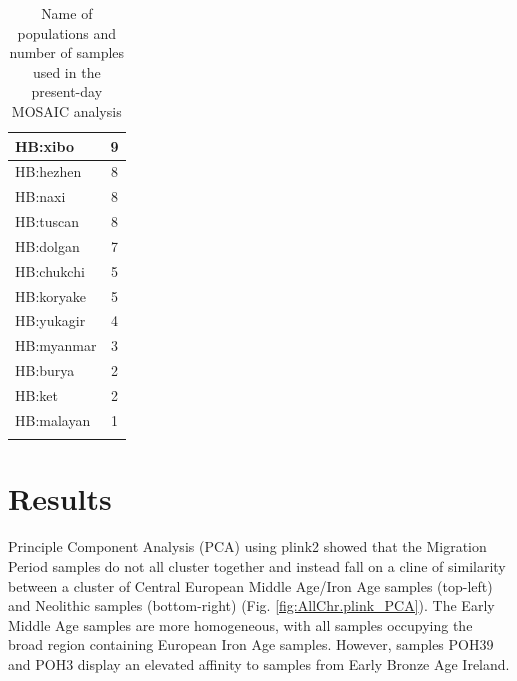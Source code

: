 \begin{table}
\begin{tabular}{l|c}
HB:xibo & 9\\
\hline
HB:hezhen & 8\\
\hline
HB:naxi & 8\\
\hline
HB:tuscan & 8\\
\hline
HB:dolgan & 7\\
\hline
HB:chukchi & 5\\
\hline
HB:koryake & 5\\
\hline
HB:yukagir & 4\\
\hline
HB:myanmar & 3\\
\hline
HB:burya & 2\\
\hline
HB:ket & 2\\
\hline
HB:malayan & 1\\
\hline
\label{table:present-day_inds_MOSAIC}
\end{tabular}
\caption{Name of populations and number of samples used in the present-day MOSAIC analysis}
\end{table}

\section{Results}

Principle Component Analysis (PCA) using plink2 showed that the Migration Period samples do not all cluster together and instead fall on a cline of similarity between a cluster of Central European Middle Age/Iron Age samples (top-left) and Neolithic samples (bottom-right) (Fig. \ref{fig:AllChr.plink_PCA}). The Early Middle Age samples are more homogeneous, with all samples occupying the broad region containing European Iron Age samples. However, samples POH39 and POH3 display an elevated affinity to samples from Early Bronze Age Ireland. 

